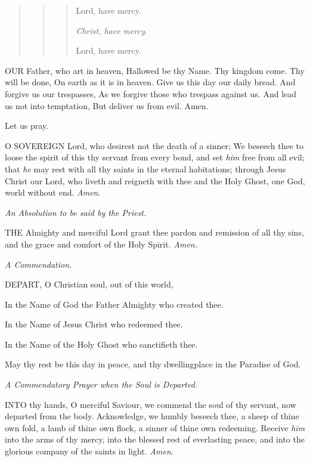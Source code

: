 \begin{quote}

\begin{quote}

\begin{quote}

Lord, have mercy. 

\emph{Christ, have mercy.}

Lord, have mercy.

\end{quote}

\end{quote}

\end{quote}

OUR
Father, who art in heaven, Hallowed be thy Name. Thy kingdom come. Thy
will be done, On earth as it is in heaven. Give us this day our daily
bread. And forgive us our trespasses, As we forgive those who trespass
against us. And lead us not into temptation, But deliver us from evil.
Amen.

Let
us pray.

O
SOVEREIGN Lord, who desirest not the death of a sinner; We beseech thee
to loose the spirit of this thy servant from every bond, and set \emph{him}
free from all evil; that \emph{he} may rest with all thy saints in
the eternal habitations; through Jesus Christ our Lord, who liveth and
reigneth with thee and the Holy Ghost, one God, world without end. \emph{Amen}.

\emph{An
Absolution to be said by the Priest.}

THE
Almighty and merciful Lord grant thee pardon and remission of all thy
sins, and the grace and comfort of the Holy Spirit. \emph{Amen.}

\emph{A
Commendation.}

DEPART,
O Christian soul, out of this world,

In the Name of God the Father Almighty who created thee. 

In the Name of Jesus Christ who redeemed thee. 

In the Name of the Holy Ghost who sanctifieth thee.

May thy rest be this day in peace, and thy dwellingplace
in the Paradise of God.

\emph{A
Commendatory Prayer when the Soul is Departed.}

INTO
thy hands, O merciful Saviour, we commend the soul of thy servant, now
departed from the body. Acknowledge, we humbly beseech thee, a sheep
of thine own fold, a lamb of thine own flock, a sinner of thine own
redeeming. Receive \emph{him} into the arms of thy mercy, into the
blessed rest of everlasting peace, and into the glorious company of
the saints in light. \emph{Amen}.

